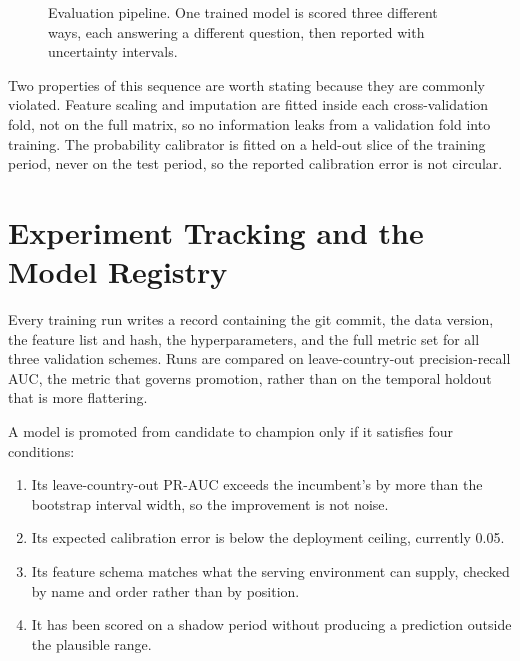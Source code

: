 \documentclass[10pt,openany]{report}
\begin{document}
\begin{figure}[htbp]
\caption{Evaluation pipeline. One trained model is scored three different ways, each
answering a different question, then reported with uncertainty intervals.}
\label{fig:evalflow}
\end{figure}


Two properties of this sequence are worth stating because they are commonly violated. Feature
scaling and imputation are fitted inside each cross-validation fold, not on the full matrix, so no
information leaks from a validation fold into training. The probability calibrator is fitted on a
held-out slice of the training period, never on the test period, so the reported calibration error
is not circular.

\section{Experiment Tracking and the Model Registry}

Every training run writes a record containing the git commit, the data version, the feature list
and hash, the hyperparameters, and the full metric set for all three validation schemes. Runs are
compared on leave-country-out precision-recall AUC, the metric that governs promotion, rather than
on the temporal holdout that is more flattering.

A model is promoted from candidate to champion only if it satisfies four conditions:

\begin{enumerate}
  \item Its leave-country-out PR-AUC exceeds the incumbent's by more than the bootstrap interval width,
        so the improvement is not noise.
  \item Its expected calibration error is below the deployment ceiling, currently 0.05.
  \item Its feature schema matches what the serving environment can supply, checked by name and
        order rather than by position.
  \item It has been scored on a shadow period without producing a prediction outside the
        plausible range.
\end{enumerate}
\end{document}
